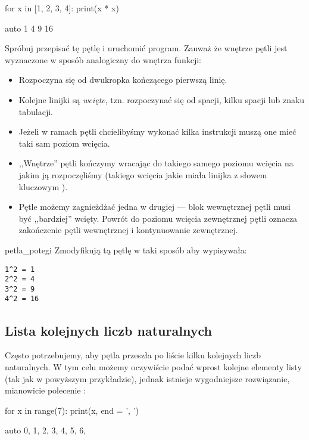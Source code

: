 \documentclass{pdfBooklets}
\begin{document}
\begin{CodeFrame}[python]{.5\textwidth}
for x in [1, 2, 3, 4]:
    print(x * x)
\end{CodeFrame}
\begin{CodeFrame}{auto}
1
4
9
16
\end{CodeFrame}

\noindent Spróbuj przepisać tę pętlę i uruchomić program.
Zauważ że wnętrze pętli jest wyznaczone w sposób analogiczny do wnętrza funkcji:
\begin{itemize}
	\item Rozpoczyna się od dwukropka kończącego pierwszą linię.
	\item Kolejne linijki są \emph{wcięte}, tzn. rozpoczynać się od spacji, kilku spacji lub znaku tabulacji.
	\item Jeżeli w ramach pętli chcielibyśmy wykonać kilka instrukcji muszą one mieć taki sam poziom wcięcia.
	\item ,,Wnętrze'' pętli kończymy wracając do takiego samego poziomu wcięcia na jakim ją rozpoczęliśmy
	      (takiego wcięcia jakie miała linijka z słowem kluczowym ).
	\item Pętle możemy zagnieżdżać jedna w drugiej --- blok wewnętrznej pętli musi być ,,bardziej'' wcięty.
	Powrót do poziomu wcięcia zewnętrznej pętli oznacza zakończenie pętli wewnętrznej i kontynuowanie zewnętrznej.
\end{itemize}

\begin{Zadanie}{}{petla_potegi}
Zmodyfikują tą pętlę w taki sposób aby wypisywała:
\begin{Verbatim}
1^2 = 1
2^2 = 4
3^2 = 9
4^2 = 16
\end{Verbatim}
\end{Zadanie}

\subsection{Lista kolejnych liczb naturalnych}
Często potrzebujemy, aby pętla przeszła po liście kilku kolejnych liczb naturalnych.
W tym celu możemy oczywiście podać wprost kolejne elementy listy (tak jak w powyższym przykładzie),
jednak istnieje wygodniejsze rozwiązanie, mianowicie polecenie :

\begin{CodeFrame}[python]{0.5\textwidth}
for x in range(7):
    print(x, end = ', ')
\end{CodeFrame}
\begin{CodeFrame}{auto}
0, 1, 2, 3, 4, 5, 6, 
\end{CodeFrame}
\end{document}
